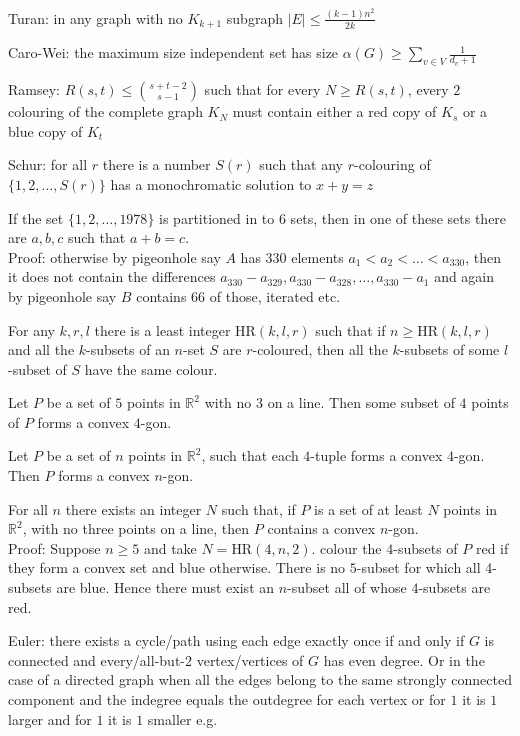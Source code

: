 Turan: in any graph with no $K_{k+1}$ subgraph $|E| \le \frac{(k-1)n^2}{2k}$

Caro-Wei: the maximum size independent set has size $\alpha (G) \ge \sum_{v \in V} \frac{1}{d_v+1}$

Ramsey: $R(s,t) \le \binom{s+t-2}{s-1}$ such that for every $N \ge R(s,t)$, every $2$ colouring of the complete graph $K_N$ must contain either a red copy of $K_s$ or a blue copy of $K_t$

Schur: for all $r$ there is a number $S(r)$ such that any $r$-colouring of $\{1,2,\dots,S(r) \}$ has a monochromatic solution to $x+y=z$

If the set $\{1,2,\dots,1978\}$ is partitioned in to $6$ sets, then in one of these sets there are $a,b,c$ such that $a+b=c$. \\
Proof: otherwise by pigeonhole say $A$ has $330$ elements $a_1 < a_2 < \dots < a_{330}$, then it does not contain the differences $a_{330}-a_{329},a_{330}-a_{328},\dots,a_{330}-a_1$ and again by pigeonhole say $B$ contains $66$ of those, iterated etc.

For any $k,r,l$ there is a least integer $\text{HR}(k,l,r)$ such that if $n \ge \text{HR}(k,l,r)$ and all the $k$-subsets of an $n$-set $S$ are $r$-coloured, then all the $k$-subsets of some $l$-subset of $S$ have the same colour.

Let $P$ be a set of $5$ points in $\mathbb{R}^2$ with no $3$ on a line. Then some subset of $4$ points of $P$ forms a convex $4$-gon.

Let $P$ be a set of $n$ points in $\mathbb{R}^2$, such that each $4$-tuple forms a convex $4$-gon. Then $P$ forms a convex $n$-gon.

For all $n$ there exists an integer $N$ such that, if $P$ is a set of at least $N$ points in $\mathbb{R}^2$, with no three points on a line, then $P$ contains a convex $n$-gon. \\
Proof: Suppose $n \ge 5$ and take $N = \text{HR}(4,n,2)$. colour the $4$-subsets of $P$ red if they form a convex set and blue otherwise. There is no $5$-subset for which all $4$-subsets are blue. Hence there must exist an $n$-subset all of whose $4$-subsets are red.

Euler: there exists a cycle/path using each edge exactly once if and only if $G$ is connected and every/all-but-$2$ vertex/vertices of $G$ has even degree. Or in the case of a directed graph when all the edges belong to the same strongly connected component and the indegree equals the outdegree for each vertex or for $1$ it is $1$ larger and for $1$ it is $1$ smaller e.g.

